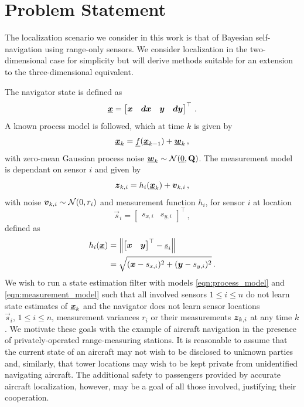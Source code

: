 \documentclass[10pt,letterpaper,oneside,twocolumn,journal]{IEEEtran}
\theoremstyle{definition}
\theoremstyle{definition}
\theoremstyle{remark}
\begin{document}
\section{Problem Statement} \label{sec:problem_statement}
The localization scenario we consider in this work is that of Bayesian self-navigation using range-only sensors. We consider localization in the two-dimensional case for simplicity but will derive methods suitable for an extension to the three-dimensional equivalent.

The navigator state is defined as 
\begin{equation}
    \rvec{x} = 
    \begin{bmatrix}
        \rv{x} & \rv{dx} & \rv{y} & \rv{dy}
    \end{bmatrix}^\top\,. \label{eqn:state_def}
\end{equation}
A known process model is followed, which at time $k$ is given by
\begin{equation}
    \rvec{x}_k = \vec{f}(\rvec{x}_{k-1})+\rvec{w}_k\,, \label{eqn:process_model}
\end{equation}
with zero-mean Gaussian process noise ${\boldsymbol{\underline{w}}}_k \sim \mathcal{N}({\underline{0}},{{\mathbf{Q}}})$. The measurement model is dependant on sensor $i$ and given by
\begin{equation}
    \rv{z}_{k,i} = h_i(\rvec{x}_k)+\rv{v}_{k,i}\,, \label{eqn:measurement_model}
\end{equation}
with noise ${\boldsymbol{v}}_{k,i} \sim \mathcal{N}(0,r_i)$ and measurement function $h_i$, for sensor $i$ at location
\begin{equation}
    \vec{s}_i = 
    \begin{bmatrix}
        s_{x,i} & s_{y,i}
    \end{bmatrix}^\top\,,
\end{equation} 
defined as
\begin{equation}
    \begin{split}
        h_i({\boldsymbol{\underline{x}}}) &= \left\lVert
        \begin{bmatrix}
            {\boldsymbol{x}} & {\boldsymbol{y}}
        \end{bmatrix}^\top
        - {\underline{s}}_{i}\right\rVert \\
        &= \sqrt{({\boldsymbol{x}}-s_{x,i})^2 + ({\boldsymbol{y}}-s_{y,i})^2}\,.
    \end{split}
\end{equation}
We wish to run a state estimation filter with models \eqref{eqn:process_model} and \eqref{eqn:measurement_model} such that all involved sensors $1 \leq i \leq n$ do not learn state estimates of ${\boldsymbol{\underline{x}}}_{k}$ and the navigator does not learn sensor locations $\vec{s}_i,\,1 \leq i \leq n$, measurement variances $r_i$ or their measurements ${\boldsymbol{z}}_{k,i}$ at any time $k$. We motivate these goals with the example of aircraft navigation in the presence of privately-operated range-measuring stations. It is reasonable to assume that the current state of an aircraft may not wish to be disclosed to unknown parties and, similarly, that tower locations may wish to be kept private from unidentified navigating aircraft. The additional safety to passengers provided by accurate aircraft localization, however, may be a goal of all those involved, justifying their cooperation.
\end{document}
